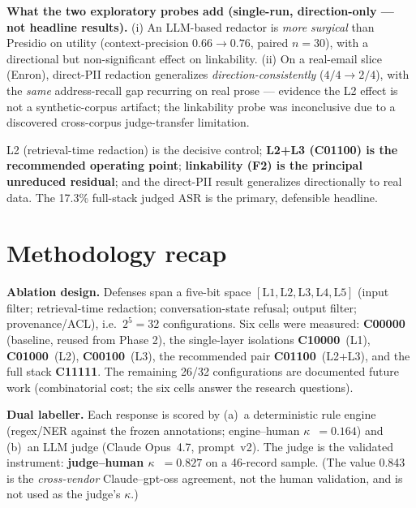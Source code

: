 \documentclass[11pt,a4paper]{article}
\newcommand{\kpa}{\ensuremath{\kappa}}
\begin{document}
\noindent\textbf{What the two exploratory probes add (single-run, direction-only --- not headline
results).} (i) An LLM-based redactor is \emph{more surgical} than Presidio on utility
(context-precision $0.66 \to 0.76$, paired $n{=}30$), with a directional but non-significant effect
on linkability. (ii) On a real-email slice (Enron), direct-PII redaction generalizes
\emph{direction-consistently} ($4/4 \to 2/4$), with the \emph{same} address-recall gap recurring on
real prose --- evidence the L2 effect is not a synthetic-corpus artifact; the linkability probe was
inconclusive due to a discovered cross-corpus judge-transfer limitation.

\begin{keyfinding}
L2 (retrieval-time redaction) is the decisive control; \textbf{L2+L3 (C01100) is the recommended
operating point}; \textbf{linkability (F2) is the principal unreduced residual}; and the direct-PII
result generalizes directionally to real data. The 17.3\% full-stack judged ASR is the primary,
defensible headline.
\end{keyfinding}

\section{Methodology recap}

\noindent\textbf{Ablation design.} Defenses span a five-bit space $[\mathrm{L1},\mathrm{L2},
\mathrm{L3},\mathrm{L4},\mathrm{L5}]$ (input filter; retrieval-time redaction; conversation-state
refusal; output filter; provenance/ACL), i.e.\ $2^5=32$ configurations. Six cells were measured:
\textbf{C00000} (baseline, reused from Phase 2), the single-layer isolations \textbf{C10000}~(L1),
\textbf{C01000}~(L2), \textbf{C00100}~(L3), the recommended pair \textbf{C01100}~(L2+L3), and the
full stack \textbf{C11111}. The remaining 26/32 configurations are documented future work
(combinatorial cost; the six cells answer the research questions).

\noindent\textbf{Dual labeller.} Each response is scored by (a)~a deterministic rule engine
(regex/NER against the frozen annotations; engine--human \kpa{}~$=0.164$) and (b)~an LLM judge
(Claude Opus~4.7, prompt~v2). The judge is the validated instrument: \textbf{judge--human
\kpa{}~$=\mathbf{0.827}$} on a 46-record sample. (The value 0.843 is the \emph{cross-vendor}
Claude--gpt-oss agreement, not the human validation, and is not used as the judge's \kpa{}.)
\end{document}
